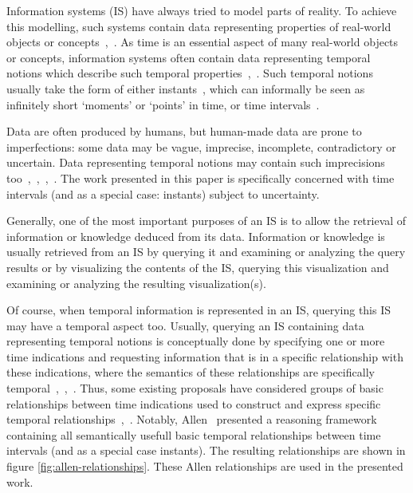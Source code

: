 Information systems (IS) have always tried to model parts of reality. To achieve this modelling, such systems contain data representing properties of real-world objects or concepts~\cite{JoseEnriquePons2012},~\cite{Billiet2012}. As time is an essential aspect of many real-world objects or concepts, information systems often contain data representing temporal notions which describe such temporal properties~\cite{Bolour1982},~\cite{VanderCruyssen1997}. Such temporal notions usually take the form of either instants~\cite{Jensen1998}, which can informally be seen as infinitely short `moments' or `points' in time, or time intervals~\cite{Jensen1998}.

Data are often produced by humans, but human-made data are prone to imperfections: some data may be vague, imprecise, incomplete, contradictory or uncertain. Data representing temporal notions may contain such imprecisions too~\cite{Devos1994},~\cite{Dubois2003},~\cite{JoseEnriquePons2012},~\cite{Billiet2012}. The work presented in this paper is specifically concerned with time intervals (and as a special case: instants) subject to uncertainty.

Generally, one of the most important purposes of an IS is to allow the retrieval of information or knowledge deduced from its data. Information or knowledge is usually retrieved from an IS by querying it and examining or analyzing the query results or by visualizing the contents of the IS, querying this visualization and examining or analyzing the resulting visualization(s).

Of course, when temporal information is represented in an IS, querying this IS may have a temporal aspect too. Usually, querying an IS containing data representing temporal notions is conceptually done by specifying one or more time indications and requesting information that is in a specific relationship with these indications, where the semantics of these relationships are specifically temporal~\cite{Billiet2012},~\cite{JoseEnriquePons2012},~\cite{Pons2012a}. Thus, some existing proposals have considered groups of basic relationships between time indications used to construct and express specific temporal relationships~\cite{Medina1994},~\cite{Schockaert2008}. Notably, Allen~\cite{Allen1983} presented a reasoning framework containing all semantically usefull basic temporal relationships between time intervals (and as a special case instants). The resulting relationships are shown in figure \ref{fig:allen-relationships}. These Allen relationships are used in the presented work.

